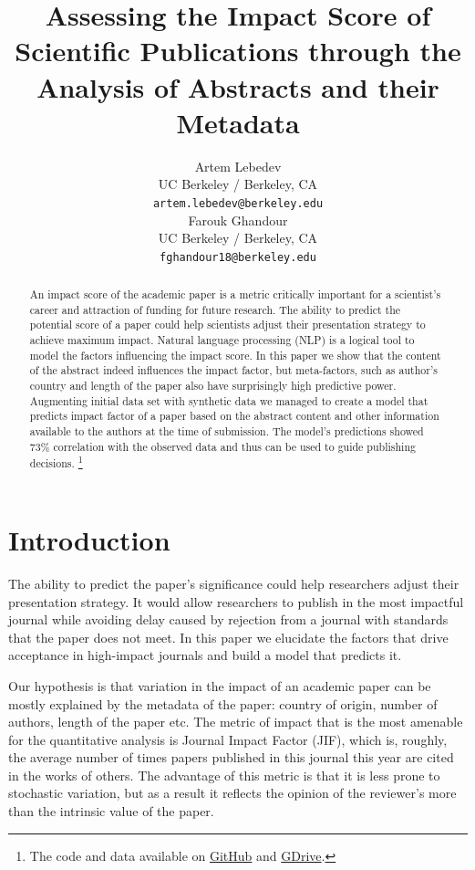 \documentclass[11pt]{article}
\title{Assessing the Impact Score of Scientific Publications through the Analysis of Abstracts and their Metadata}
\author{Artem Lebedev\\
  UC Berkeley / Berkeley, CA \\
  \texttt{artem.lebedev@berkeley.edu} \\\And
 Farouk Ghandour \\
  UC Berkeley / Berkeley, CA \\
  \texttt{fghandour18@berkeley.edu} \\}
\begin{document}
\maketitle

\begin{abstract}
An impact score of the academic paper is a metric critically important for a scientist's career and attraction of funding for future research. The ability to predict the potential score of a paper could help scientists adjust their presentation strategy to achieve maximum impact. Natural language processing (NLP) is a logical tool to model the factors influencing the impact score. In this paper we show that the content of the abstract indeed influences the impact factor, but meta-factors, such as author's country and length of the paper also have surprisingly high predictive power. Augmenting initial data set with synthetic data we managed to create a model that predicts impact factor of a paper based on the abstract content and other information available to the authors at the time of submission. The model's predictions showed 73\% correlation with the observed data and thus can be used to guide publishing decisions. \footnote{The code and data available on \href{https://github.com/ArtemChemist/w266_project}{GitHub} and \href{https://drive.google.com/drive/folders/1OkSzswtFvqA6_FD35vvSCU31kSd1ECA2?usp=drive_link}{GDrive}.}
\end{abstract}

\section{Introduction}
The ability to predict the paper's significance could help researchers adjust their presentation strategy. It would allow researchers to publish in the most impactful journal while avoiding delay caused by rejection from a journal with standards that the paper does not meet. In this paper we elucidate the factors that drive acceptance in high-impact journals and build a model that predicts it.

Our hypothesis is that variation in the impact of an academic paper can be mostly explained by the metadata of the paper: country of origin, number of authors, length of the paper etc. The metric of impact that is the most amenable for the quantitative analysis is Journal Impact Factor (JIF), which is, roughly, the average number of times papers published in this journal this year are cited in the works of others. The advantage of this metric is that it is less prone to stochastic variation, but as a result it reflects the opinion of the reviewer's more than the intrinsic value of the paper.     
\end{document}
